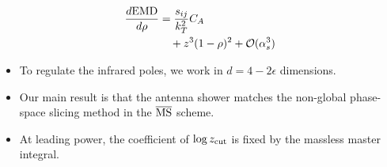 \begin{align}
  \frac{d \mathrm{EMD}}{d \rho} &= \frac{s_{ij}}{k_T^2} C_A \nonumber \\
  &\quad + {z}^{3} (1 - \rho)^{2} + \mathcal{O}(\alpha_s^3) \label{eq:3}
\end{align}

\begin{itemize}
  \item To regulate the infrared poles, we work in $d = 4 - 2\epsilon$ dimensions.
  \item Our main result is that the antenna shower matches the non-global phase-space slicing method in the $\overline{\rm MS}$ scheme.
  \item At leading power, the coefficient of $\log z_{\rm cut}$ is fixed by the massless master integral.
\end{itemize}

